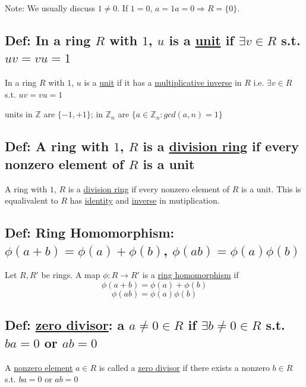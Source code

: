 \documentclass[11pt]{elegantbook}
\begin{document}
Note: We usually discuss $1\neq 0$. If $1=0$, $a=1a=0 \Rightarrow R=\{0\}$.

\subsection{Def: In a ring $R$ with $1$, $u$ is a \underline{unit} if $\exists v\in R$ s.t. $uv=vu=1$}
\begin{definition}
    In a ring $R$ with $1$, $u$ is a \underline{unit} if it has a \underline{multiplicative
    inverse} in $R$ i.e. $\exists v\in R$ s.t. $uv=vu=1$
\end{definition}
\begin{example}
    units in $\mathbb{Z}$ are $\{-1,+1\}$; in $\mathbb{Z}_n$ are $\{a\in \mathbb{Z}_n:gcd(a,n)=1\}$
\end{example}

\subsection{Def: A ring with $1$, $R$ is a \underline{division ring} if every nonzero element of $R$ is a unit}
\begin{definition}
    A ring with $1$, $R$ is a \underline{division ring} if every nonzero element of $R$ is a unit. This is equalivalent to $R$ has \underline{identity} and \underline{inverse} in mutiplication.
\end{definition}

\subsection{Def: Ring Homomorphism: $\phi(a+b)=\phi(a)+\phi(b)$, $\phi(ab)=\phi(a)\phi(b)$}
\begin{definition}
    Let $R,R'$ be rings. A map $\phi:R \rightarrow R'$ is a \underline{ring homomorphism} if $$\phi(a+b)=\phi(a)+\phi(b)$$ $$\phi(ab)=\phi(a)\phi(b)$$
\end{definition}

\subsection{Def: \underline{zero divisor}: a $a\neq 0\in R$ if $\exists b\neq 0\in R$ s.t. $ba=0$ or $ab=0$}
\begin{definition}
    A \underline{nonzero element} $a\in R$ is called a \underline{zero divisor} if there exists a nonzero $b\in R$ s.t. $ba=0$ or $ab=0$
\end{definition}
\end{document}
